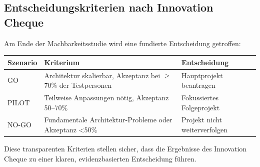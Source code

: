 \documentclass[11pt,a4paper]{article}
\begin{document}
\subsection{Entscheidungskriterien nach Innovation Cheque}

Am Ende der Machbarkeitsstudie wird eine fundierte Entscheidung getroffen:

\begin{table}[h]
\centering
\begin{tabular}{@{}L{2cm}L{7cm}L{4cm}@{}}
\toprule
\textbf{Szenario} & \textbf{Kriterium} & \textbf{Entscheidung} \\
\midrule
GO & Architektur skalierbar, Akzeptanz bei $\geq$70\% der Testpersonen & Hauptprojekt beantragen \\
PILOT & Teilweise Anpassungen nötig, Akzeptanz 50--70\% & Fokussiertes Folgeprojekt \\
NO-GO & Fundamentale Architektur-Probleme oder Akzeptanz <50\% & Projekt nicht weiterverfolgen \\
\bottomrule
\end{tabular}
\end{table}

Diese transparenten Kriterien stellen sicher, dass die Ergebnisse des Innovation Cheque zu einer klaren, evidenzbasierten Entscheidung führen.

\vspace{1cm}

\newpage

\end{document}

